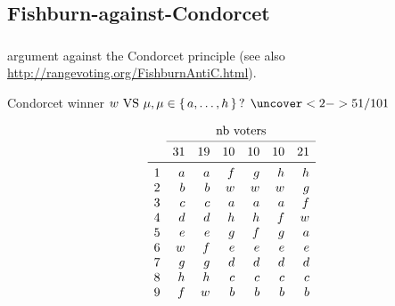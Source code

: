 \documentclass[french,english]{beamer}
\begin{document}
\subsection{Fishburn-against-Condorcet}
\begin{frame}[fragile]
	\frametitle{\subsecname}
	\begin{minipage}{5.5cm}
		\citet[p. 544]{fishburn_paradoxes_1974} argument against the Condorcet principle (see also \url{http://rangevoting.org/FishburnAntiC.html}).
		\begin{block}{Condorcet winner}
			$w \text{ VS } \mu, \mu \in \set{a, \ldots, h}\text{? }\uncover<2->{51/101}$
		\end{block}
	\end{minipage}%
	\begin{minipage}{\columnwidth-5cm}
		\small
		\begin{equation}
			\begin{array}{lrrrrrr}
				&\multicolumn{6}{c}{\text{nb voters}}\\
			\cmidrule{2-7}
					&31	&19	&10	&10	&10	&21	\\
			\midrule
				1	&a	&a	&f	&g	&h	&h	\\
				2	&b	&b	&w	&w	&w	&g	\\
				3	&c	&c	&a	&a	&a	&f	\\
				4	&d	&d	&h	&h	&f	&w	\\
				5	&e	&e	&g	&f	&g	&a	\\
				6	&w	&f	&e	&e	&e	&e	\\
				7	&g	&g	&d	&d	&d	&d	\\
				8	&h	&h	&c	&c	&c	&c	\\
				9	&f	&w	&b	&b	&b	&b	\\
			\end{array}
		\end{equation}

\end{minipage}
\end{frame}
\end{document}
